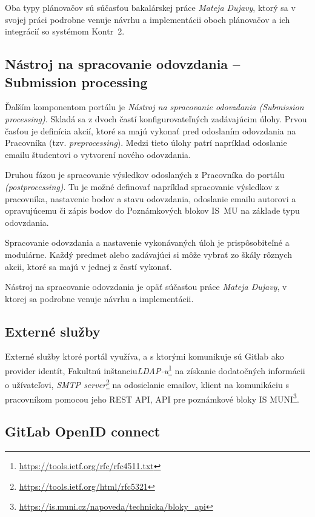 \documentclass[
  digital, %
  twoside, %
  table,   %
  lof,     %
  lot,     %
]{fithesis3}
\begin{document}
Oba typy plánovačov sú súčasťou bakalárskej práce \emph{Mateja Dujavy}\cite{kontr-scheduler}, ktorý sa v svojej práci podrobne venuje návrhu a implementácii oboch plánovačov a ich integrácií so systémom Kontr~2.

\subsection{Nástroj na spracovanie odovzdania -- Submission processing}

Ďalším komponentom portálu je \emph{Nástroj na spracovanie odovzdania (Submission processing)}. Skladá sa z dvoch častí konfigurovateľných zadávajúcim úlohy. Prvou časťou je definícia akcií, ktoré sa majú vykonať pred odoslaním odovzdania na Pracovníka (tzv. \emph{preprocessing}). Medzi tieto úlohy patrí napríklad odoslanie emailu študentovi o vytvorení nového odovzdania.

Druhou fázou je spracovanie výsledkov odoslaných z Pracovníka do portálu \emph{(postprocessing)}. Tu je možné definovať napríklad spracovanie výsledkov z pracovníka, nastavenie bodov a stavu odovzdania, odoslanie emailu autorovi a opravujúcemu či zápis bodov do Poznámkových blokov IS~MU na základe typu odovzdania. 

Spracovanie odovzdania a nastavenie vykonávaných úloh je prispôsobiteľné a modulárne. Každý predmet alebo zadávajúci si môže vybrať zo škály rôznych akcii, ktoré sa majú v jednej z častí vykonať.

Nástroj na spracovanie odovzdania je opäť súčasťou práce \emph{Mateja Dujavy}\cite{kontr-scheduler}, v ktorej sa podrobne venuje návrhu a implementácii.

\subsection{Externé služby}

Externé služby ktoré portál využíva, a s ktorými komunikuje sú Gitlab ako provider identít, Fakultnú inštanciu\emph{LDAP-u}\footnote{\url{https://tools.ietf.org/rfc/rfc4511.txt}} na získanie dodatočných informácii o užívateľovi, \emph{SMTP server}\footnote{\url{https://tools.ietf.org/html/rfc5321}} na odosielanie emailov, klient na komunikáciu s pracovníkom pomocou jeho REST API, API pre poznámkové bloky IS MUNI\footnote{\url{https://is.muni.cz/napoveda/technicka/bloky_api}}. 


\subsection{GitLab OpenID connect}
\end{document}

